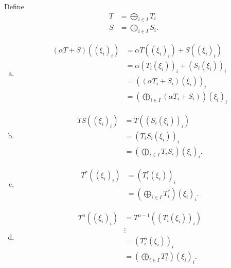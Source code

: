 \documentclass[10pt]{mypackage}
\begin{document}
\begin{solution}
  Define
  \begin{align*}
    T &= \bigoplus_{i\in I}T_i\\
    S &= \bigoplus_{i\in I}S_i.
  \end{align*}
  \begin{enumerate}[(a)]
    \item 
      \begin{align*}
        \left(\alpha T + S\right)\left(\left(\xi_i\right)_i\right) &= \alpha T\left(\left(\xi_i\right)_i\right) + S\left(\left(\xi_i\right)_i\right)\\
                                                                   &= \alpha \left(T_i\left(\xi_i\right)\right)_i + \left(S_i\left(\xi_i\right)\right)_i\\
                                                                   &= \left(\left(\alpha T_i + S_i\right)\left(\xi_i\right)\right)_i\\
                                                                   &= \left(\bigoplus_{i\in I}\left(\alpha T_i + S_i\right)\right)\left(\xi_i\right)_i
      \end{align*}
    \item 
      \begin{align*}
        TS\left(\left(\xi_i\right)_i\right) &= T\left(\left(S_i\left(\xi_i\right)\right)_i\right)\\
                                            &= \left(T_iS_i\left(\xi_i\right)\right)_i\\
                                            &= \left(\bigoplus_{i\in I}T_iS_i\right)\left(\xi_i\right)_i.
      \end{align*}
    \item 
      \begin{align*}
        T^{\ast}\left(\left(\xi_i\right)_i\right) &= \left(T_i^{\ast}\left(\xi_i\right)\right)_i\\
                                                  &= \left(\bigoplus_{i\in I}T_i^{\ast}\right)\left(\xi_i\right)_i.
      \end{align*}
    \item 
      \begin{align*}
        T^n\left(\left(\xi_i\right)_i\right) &= T^{n-1}\left(\left(T_i\left(\xi_i\right)\right)_i\right)\\
                                             &\vdots\\
                                             &= \left(T_i^{n}\left(\xi_i\right)\right)_i\\
                                             &= \left(\bigoplus_{i\in I}T_i^n\right)\left(\xi_i\right)_i.
      \end{align*}
  \end{enumerate}
\end{solution}
\end{document}

